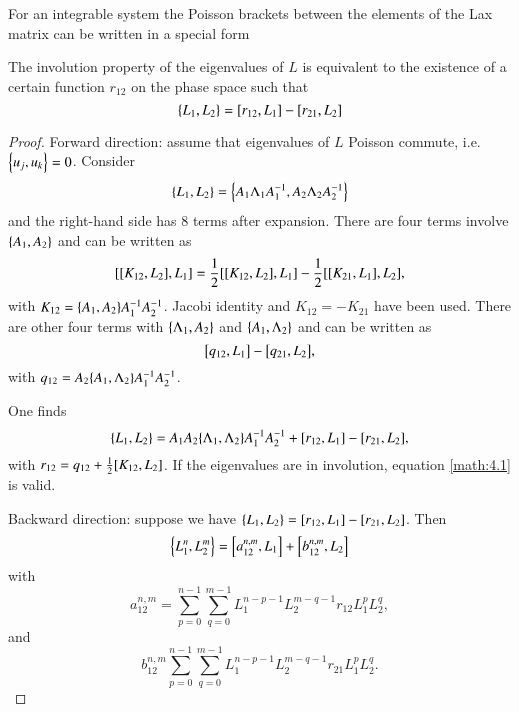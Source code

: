 
For an integrable system the Poisson brackets between the elements of the Lax matrix can be written in a special form

\begin{prop}
	The involution property of the eigenvalues of $L$ is equivalent to the existence of a certain function $r_{12}$ on the phase space such that 
	\begin{equation}
		\pb{L_1}{L_2} = \comm{r_{12}}{L_1} - \comm{r_{21}}{L_2}
		\label{math:4.1}
	\end{equation}
\end{prop}

\begin{proof}
	Forward direction: assume that eigenvalues of $L$ Poisson commute, i.e. $\pb{u_j}{u_k}=0$. Consider
	\begin{align*}
		\pb{L_1}{L_2} = \pb{A_1 \Lambda_1 A_1^{-1}}{A_2 \Lambda_2 A_2^{-1}}
	\end{align*}
	and the right-hand side has $8$ terms after expansion. 
	There are four terms involve $\pb{A_1}{A_2}$ and can be written as
	\begin{align*}
		\comm{\comm{K_{12}}{L_2}}{L_1} = \frac{1}{2} \comm{\comm{K_{12}}{L_2}}{L_1} - \frac{1}{2} \comm{\comm{K_{21}}{L_1}}{L_2},
	\end{align*}
	with $K_{12} = \pb{A_1}{A_2} A_1^{-1} A_2^{-1}$. Jacobi identity and $K_{12} =- K_{21}$ have been used.  There are other four terms with $\pb{\Lambda_1}{A_2}$ and $\pb{A_1}{\Lambda_2}$ and can be written as 
	\begin{equation*}
		\comm{q_{12}}{L_1} - \comm{q_{21}}{L_2},
	\end{equation*}
	with $q_{12} = A_2 \pb{A_1}{\Lambda_2} A_1^{-1} A_2^{-1}$.

	One finds 
	\begin{equation*}
	\pb{L_1}{L_2} = A_1 A_2 \pb{\Lambda_1}{\Lambda_2} A_1^{-1} A_2^{-1} + \comm{r_{12}}{L_1} - \comm{r_{21}}{L_2},
	\end{equation*}
	with $r_{12} = q_{12} + \frac{1}{2} \comm{K_{12}}{L_2}$. If the eigenvalues are in involution, equation \eqref{math:4.1} is valid.

	Backward direction: suppose we have $\pb{L_1}{L_2} = \comm{r_{12}}{L_1} - \comm{r_{21}}{L_2}$. Then
	\begin{equation}
		\pb{L_1^n}{L_2^m} = \comm{a_{12}^{n, m}}{L_1} + \comm{b_{12}^{n, m}}{L_2}
		\label{math:4.2}
	\end{equation}
	with 
	\begin{equation*}
		a_{12}^{n, m} = \sum_{p=0}^{n-1} \sum_{q=0}^{m-1} L_1^{n-p-1} L_2^{m-q-1} r_{12} L_1^p L_2^q,
	\end{equation*}
	and 
	\begin{equation*}
		b_{12}^{n, m}\sum_{p=0}^{n-1} \sum_{q=0}^{m-1} L_1^{n-p-1} L_2^{m-q-1} r_{21} L_1^p L_2^q.
	\end{equation*}


\end{proof}
